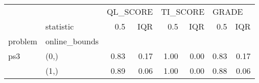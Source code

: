 \begin{tabular}{llrrrrrr}
\toprule
    & {} & \multicolumn{2}{l}{QL\_SCORE} & \multicolumn{2}{l}{TI\_SCORE} & \multicolumn{2}{l}{GRADE} \\
    & statistic &      0.5 &  IQR &      0.5 &  IQR &   0.5 &  IQR \\
problem & online\_bounds &          &      &          &      &       &      \\
\midrule
ps3 & (0,) &     0.83 & 0.17 &     1.00 & 0.00 &  0.83 & 0.17 \\
    & (1,) &     0.89 & 0.06 &     1.00 & 0.00 &  0.88 & 0.06 \\
\bottomrule
\end{tabular}
